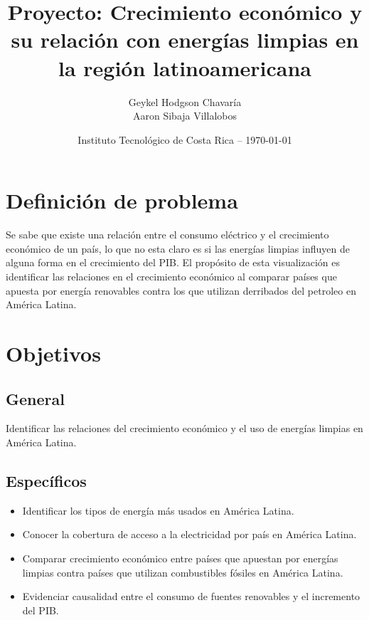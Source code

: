 \documentclass{article}
\title{Proyecto: Crecimiento económico y su relación con energías limpias en la región latinoamericana} %
\author{Geykel Hodgson Chavaría\\ 
Aaron Sibaja Villalobos  
} %
\date{Instituto  Tecnológico de Costa Rica -- \today} %
\begin{document}
\renewcommand{\listtablename}{Índice de tablas}
\renewcommand{\tablename}{Tabla} 

\maketitle %


\section{Definición de problema}
Se sabe que existe una relación entre el consumo eléctrico y el crecimiento económico de un país, lo que no esta claro es si las energías limpias influyen de alguna forma en el crecimiento del PIB. El propósito de esta visualización es identificar las relaciones en el crecimiento económico al comparar países que apuesta por energía renovables contra los que utilizan derribados del petroleo en América Latina.

\section{Objetivos}
\subsection{General}
Identificar las relaciones del crecimiento económico y el uso de energías limpias en América Latina.
\subsection{Específicos }
\begin{itemize}
    \item Identificar los tipos de energía más usados en América Latina.
    \item Conocer la cobertura de acceso a la electricidad por país en América Latina.
    \item Comparar crecimiento económico entre países que apuestan por energías limpias contra países que utilizan combustibles fósiles en América Latina.
    \item Evidenciar causalidad entre el consumo de fuentes renovables y el incremento del PIB.
\end{itemize}
\end{document}
